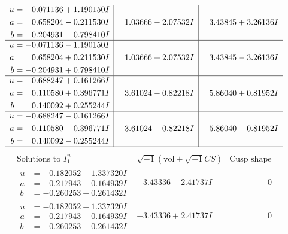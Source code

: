\documentclass[1p]{elsarticle_modified}
\theoremstyle{definition}
\newcommand{\I}{\sqrt{-1}}
\begin{document}
$$\begin{array}{c|c|c}
\begin{aligned}
u &= -0.071136 + 1.190150 I \\
a &= \phantom{-}0.658204 - 0.211530 I \\
b &= -0.204931 - 0.798410 I\end{aligned}
 & \phantom{-}1.03666 - 2.07532 I & \phantom{-}3.43845 + 3.26136 I \\ \hline\begin{aligned}
u &= -0.071136 - 1.190150 I \\
a &= \phantom{-}0.658204 + 0.211530 I \\
b &= -0.204931 + 0.798410 I\end{aligned}
 & \phantom{-}1.03666 + 2.07532 I & \phantom{-}3.43845 - 3.26136 I \\ \hline\begin{aligned}
u &= -0.688247 + 0.161266 I \\
a &= \phantom{-}0.110580 + 0.396771 I \\
b &= \phantom{-}0.140092 + 0.255244 I\end{aligned}
 & \phantom{-}3.61024 - 0.82218 I & \phantom{-}5.86040 + 0.81952 I \\ \hline\begin{aligned}
u &= -0.688247 - 0.161266 I \\
a &= \phantom{-}0.110580 - 0.396771 I \\
b &= \phantom{-}0.140092 - 0.255244 I\end{aligned}
 & \phantom{-}3.61024 + 0.82218 I & \phantom{-}5.86040 - 0.81952 I\\
 \hline 
 \end{array}$$\newpage$$\begin{array}{c|c|c}  
\text{Solutions to }I^u_{1}& \I (\text{vol} + \sqrt{-1}CS) & \text{Cusp shape}\\
 \hline 
\begin{aligned}
u &= -0.182052 + 1.337320 I \\
a &= -0.217943 - 0.164939 I \\
b &= -0.260253 + 0.261432 I\end{aligned}
 & -3.43336 - 2.41737 I & \phantom{-0.000000 } 0 \\ \hline\begin{aligned}
u &= -0.182052 - 1.337320 I \\
a &= -0.217943 + 0.164939 I \\
b &= -0.260253 - 0.261432 I\end{aligned}
 & -3.43336 + 2.41737 I & \phantom{-0.000000 } 0 \\ \hline\begin{aligned}

\end{aligned}
\end{array}$$
\end{document}
